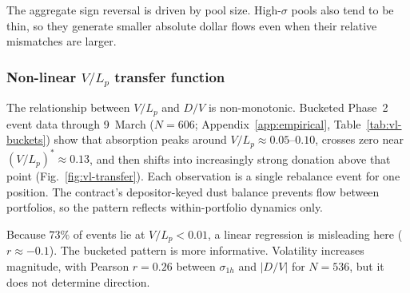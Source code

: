 \documentclass{manuscript}
\begin{document}
The aggregate sign reversal is driven by pool size. High-$\sigma$ pools also tend to be thin, so they generate smaller absolute dollar flows even when their relative mismatches are larger.

\subsubsection{Non-linear $V/L_p$ transfer function}

The relationship between $V/L_p$ and $D/V$ is non-monotonic. Bucketed Phase~2 event data through 9~March ($N = 606$; Appendix~\ref{app:empirical}, Table~\ref{tab:vl-buckets}) show that absorption peaks around $V/L_p \approx 0.05$--$0.10$, crosses zero near $(V/L_p)^{*} \approx 0.13$, and then shifts into increasingly strong donation above that point (Fig.~\ref{fig:vl-transfer}). Each observation is a single rebalance event for one position. The contract's depositor-keyed dust balance prevents flow between portfolios, so the pattern reflects within-portfolio dynamics only.

Because $73\%$ of events lie at $V/L_p < 0.01$, a linear regression is misleading here ($r \approx -0.1$). The bucketed pattern is more informative. Volatility increases magnitude, with Pearson $r = 0.26$ between $\sigma_{1h}$ and $|D/V|$ for $N = 536$, but it does not determine direction.
\end{document}
